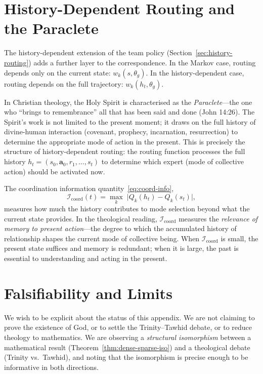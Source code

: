 \section{History-Dependent Routing and the Paraclete}
\label{sec:paraclete}

The history-dependent extension of the team policy (Section~\ref{sec:history-routing}) adds a further layer to the correspondence. In the Markov case, routing depends only on the current state: $w_k(s,\theta_g)$. In the history-dependent case, routing depends on the full trajectory: $w_k(h_t,\theta_g)$.

In Christian theology, the Holy Spirit is characterised as the \emph{Paraclete}---the one who ``brings to remembrance'' all that has been said and done (John 14:26). The Spirit's work is not limited to the present moment; it draws on the full history of divine-human interaction (covenant, prophecy, incarnation, resurrection) to determine the appropriate mode of action in the present. This is precisely the structure of history-dependent routing: the routing function processes the full history $h_t = (s_0, \bm{a}_0, r_1, \ldots, s_t)$ to determine which expert (mode of collective action) should be activated now.

The coordination information quantity~\eqref{eq:coord-info},
\[
  \mathcal{I}_{\mathrm{coord}}(t) = \max_k\;\bigl|Q_k(h_t) - Q_k(s_t)\bigr|,
\]
measures how much the history contributes to mode selection beyond what the current state provides. In the theological reading, $\mathcal{I}_{\mathrm{coord}}$ measures the \emph{relevance of memory to present action}---the degree to which the accumulated history of relationship shapes the current mode of collective being. When $\mathcal{I}_{\mathrm{coord}}$ is small, the present state suffices and memory is redundant; when it is large, the past is essential to understanding and acting in the present.

\section{Falsifiability and Limits}
\label{sec:falsifiability}

We wish to be explicit about the status of this appendix. We are not claiming to prove the existence of God, or to settle the Trinity--Tawhid debate, or to reduce theology to mathematics. We are observing a \emph{structural isomorphism} between a mathematical result (Theorem~\ref{thm:dense-sparse-iso}) and a theological debate (Trinity vs.\ Tawhid), and noting that the isomorphism is precise enough to be informative in both directions.

